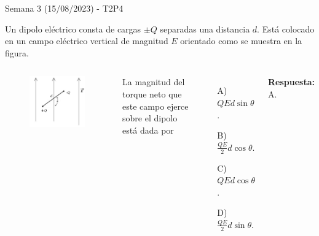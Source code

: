 \begin{frame}{Semana 3 (15/08/2023) - T2P4}

    Un dipolo eléctrico consta de cargas $\pm Q$ separadas una distancia $d$. Está colocado en un campo eléctrico vertical de magnitud $E$ orientado como se muestra en la figura.
    
    \begin{columns}
    
    \begin{figure}
        \centering
        \includegraphics[scale=0.35]{figures/t2p4.png}
    \end{figure}
    
    
    La magnitud del torque neto que este campo ejerce sobre el dipolo est\'a dada por
    
    \begin{itemize}
        \item[A)] $QEd\sin\theta$.
        \item[B)] $\frac{QE}{2}d\cos\theta$.
        \item[C)] $QEd\cos\theta$.
        \item[D)] $\frac{QE}{2}d\sin\theta$.
    \end{itemize}
    
    \pause\bigskip\centering\textbf{Respuesta:} A.
    
    \end{columns}
    
\end{frame}

